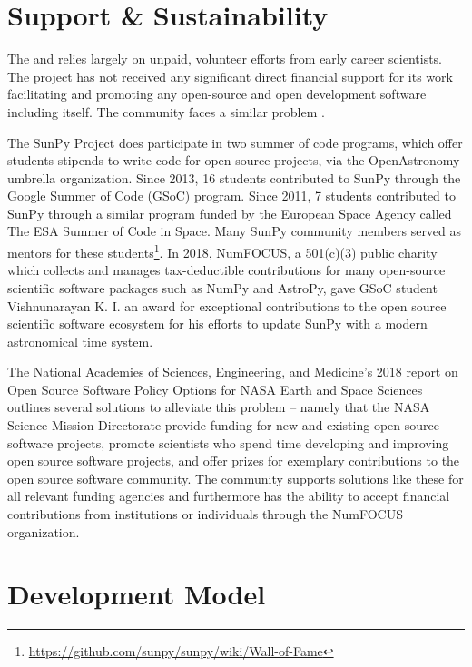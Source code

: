 \section{Support \& Sustainability}

The \sunpyproj and relies largely on unpaid, volunteer efforts from early career scientists. 
The project has not received any significant direct financial support for its work facilitating and promoting any open-source and open development software including \sunpy itself. 
The \astropy community faces a similar problem \citep{PriceWhelan:2018ji, Muna2016}. 

The SunPy Project does participate in two summer of code programs, which offer students stipends to write code for open-source projects, via the OpenAstronomy umbrella organization. Since 2013, 16 students contributed to SunPy through the Google Summer of Code (GSoC) program. Since 2011, 7 students contributed to SunPy through a similar program funded by the European Space Agency called The ESA Summer of Code in Space. Many SunPy community members served as mentors for these students\footnote{\url{https://github.com/sunpy/sunpy/wiki/Wall-of-Fame}}. In 2018, NumFOCUS, a 501(c)(3) public charity which collects and manages tax-deductible contributions for many open-source scientific software packages such as NumPy and AstroPy, gave GSoC student Vishnunarayan K. I. an award for exceptional contributions to the open source scientific software ecosystem for his efforts to update SunPy with a modern astronomical time system.

The National Academies of Sciences, Engineering, and Medicine's 2018 report on Open Source Software Policy Options for NASA Earth and Space Sciences \citep{NAP2018} outlines several solutions to alleviate this problem -- namely that the NASA Science Mission Directorate provide funding for new and existing open source software projects, promote scientists who spend time developing and improving open source software projects, and offer prizes for exemplary contributions to the open source software community. 
The \sunpy community supports solutions like these for all relevant funding agencies and furthermore has the ability to accept financial contributions from institutions or individuals through the NumFOCUS organization.

\section{Development Model}

